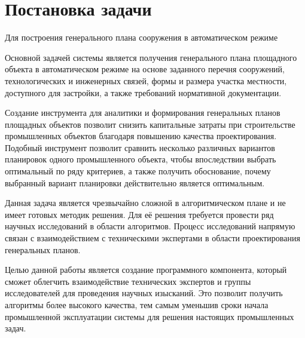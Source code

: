 \section*{\Large{Постановка задачи}}


Для построения генерального плана сооружения в автоматическом режиме


Основной задачей системы является получения генерального плана площадного объекта в автоматическом режиме на основе
заданного перечня сооружений, технологических и инженерных связей,
формы и размера участка местности, доступного для застройки, а также требований нормативной документации.

Создание инструмента для аналитики и формирования генеральных планов площадных объектов позволит снизить
капитальные затраты при строительстве промышленных объектов благодаря повышению качества проектирования.
Подобный инструмент позволит сравнить несколько различных вариантов планировок одного промышленного объекта,
чтобы впоследствии выбрать оптимальный по ряду критериев, а также получить обоснование,
почему выбранный вариант планировки действительно является оптимальным.

Данная задача является чрезвычайно сложной в алгоритмическом плане и не имеет готовых методик решения.
Для её решения требуется провести ряд научных исследований в области алгоритмов.
Процесс исследований напрямую связан с взаимодействием с техническими экспертами
в области проектирования генеральных планов.




Целью данной работы является создание программного компонента,
который сможет облегчить взаимодействие технических экспертов
и группы исследователей для проведения научных изысканий.
Это позволит получить алгоритмы более высокого качества,
тем самым уменьшив сроки начала промышленной эксплуатации системы для решения настоящих промышленных задач.